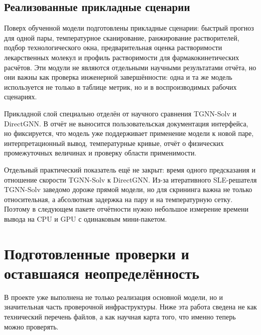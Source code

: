\documentclass[11pt]{article}
\theoremstyle{definition}
\begin{document}
\subsection{Реализованные прикладные сценарии}

Поверх обученной модели подготовлены прикладные сценарии: быстрый прогноз для одной пары, температурное сканирование, ранжирование растворителей, подбор технологического окна, предварительная оценка растворимости лекарственных молекул и профиль растворимости для фармакокинетических расчётов. Эти модули не являются отдельными научными результатами отчёта, но они важны как проверка инженерной завершённости: одна и та же модель используется не только в таблице метрик, но и в воспроизводимых рабочих сценариях.

Прикладной слой специально отделён от научного сравнения TGNN-Solv и DirectGNN. В отчёт не выносится пользовательская документация интерфейса, но фиксируется, что модель уже поддерживает применение модели к новой паре, интерпретационный вывод, температурные кривые, отчёт о физических промежуточных величинах и проверку области применимости.

Отдельный практический показатель ещё не закрыт: время одного предсказания и отношение скорости TGNN-Solv к DirectGNN. Из-за итеративного SLE-решателя TGNN-Solv заведомо дороже прямой модели, но для скрининга важна не только относительная, а абсолютная задержка на пару и на температурную сетку. Поэтому в следующем пакете отчётности нужно небольшое измерение времени вывода на CPU и GPU с одинаковым мини-пакетом.


\section{Подготовленные проверки и оставшаяся неопределённость}

В проекте уже выполнена не только реализация основной модели, но и значительная часть проверочной инфраструктуры. Ниже эта работа сведена не как технический перечень файлов, а как научная карта того, что именно теперь можно проверять.
\end{document}
